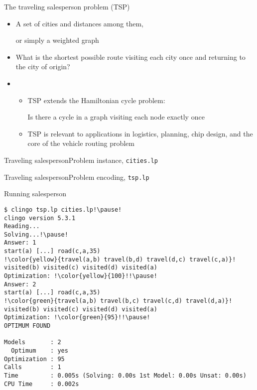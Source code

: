\begin{frame}[c]{The traveling salesperson problem (TSP)}
  \begin{itemize}
  \item {} A set of cities and distances among them,

    or simply a weighted graph
    \smallskip
  \item {} What is the shortest possible route visiting each city once and returning to the city of origin?
    \bigskip
  \item<2-> 
    \begin{itemize}
    \item TSP extends the Hamiltonian cycle problem:
      \par
      Is there a cycle in a graph visiting each node exactly once
      \smallskip
    \item TSP is relevant to applications in logistics, planning, chip design,
      and the core of the vehicle routing problem
    \end{itemize}
  \end{itemize}
\end{frame}
\begin{frame}[fragile]{Traveling salesperson}{Problem instance, \texttt{cities.lp}}

\end{frame}
\begin{frame}[fragile]{Traveling salesperson}{Problem encoding, \texttt{tsp.lp}}

%
\end{frame}
\begin{frame}{Running salesperson}
\begin{lstlisting}[escapechar=!]
$ clingo tsp.lp cities.lp!\pause!
clingo version 5.3.1
Reading...
Solving...!\pause!
Answer: 1
start(a) [...] road(c,a,35)
!\color{yellow}{travel(a,b) travel(b,d) travel(d,c) travel(c,a)}!
visited(b) visited(c) visited(d) visited(a)
Optimization: !\color{yellow}{100}!!\pause!
Answer: 2
start(a) [...] road(c,a,35)
!\color{green}{travel(a,b) travel(b,c) travel(c,d) travel(d,a)}!
visited(b) visited(c) visited(d) visited(a)
Optimization: !\color{green}{95}!!\pause!
OPTIMUM FOUND

Models       : 2
  Optimum    : yes
Optimization : 95
Calls        : 1
Time         : 0.005s (Solving: 0.00s 1st Model: 0.00s Unsat: 0.00s)
CPU Time     : 0.002s
\end{lstlisting}
\end{frame}
